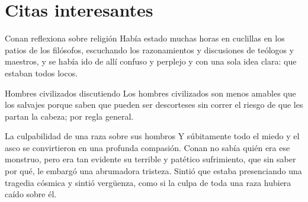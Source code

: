 \section{Citas interesantes}

\begin{frame}{}
\begin{exampleblock}{Conan reflexiona sobre religión}
Había estado muchas horas en cuclillas en los patios de los filósofos, escuchando los razonamientos y discusiones de teólogos y maestros, y se había ido de allí confuso y perplejo y con una sola idea clara: que estaban todos locos.
\end{exampleblock}
\end{frame}
\note{

}

\begin{frame}{}
\begin{exampleblock}{Hombres civilizados discutiendo}
Los hombres civilizados son menos amables que los salvajes porque saben que pueden ser descorteses sin correr el riesgo de que les partan la cabeza; por regla general.
\end{exampleblock}
\end{frame}
\note{

}

\begin{frame}{}
\begin{exampleblock}{La culpabilidad de una raza sobre sus hombros}
Y súbitamente todo el miedo y el asco se convirtieron en una profunda compasión. Conan no sabía quién era ese monstruo, pero era tan evidente su terrible y patético sufrimiento, que sin saber por qué, le embargó una abrumadora tristeza. Sintió que estaba presenciando una tragedia cósmica y sintió vergüenza, como si la culpa de toda una raza hubiera caído sobre él.
\end{exampleblock}
\end{frame}
\note{

}

